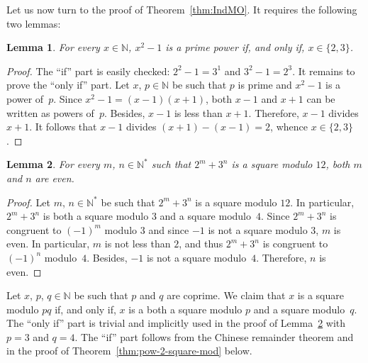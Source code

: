 \documentclass[12pt]{article}
\newcommand{\bN}{\mathbb{N}} %
\newcommand{\bNast}{\bN^*}
\newtheorem{lemma}{Lemma}
\newtheorem{proposition}{Proposition}
\theoremstyle{definition}
\begin{document}
   
   Let us now turn to the proof of Theorem~\ref{thm:IndMO}.
   It requires the following two lemmas:

     \begin{lemma} \label{lem:x2=q+1}
       For every $x \in \bN$, $x^2 - 1$ is a prime power if, and only if, $x \in \{ 2, 3 \}$. 
     \end{lemma}

     \begin{proof}
       The ``if'' part is easily checked: $2^2 - 1 = 3^1$ and $3^2 - 1 = 2^3$. 
       It remains to prove the ``only if'' part.
       Let $x$, $p \in \bN$ be such that $p$ is prime and $x^2 - 1$ is a power of~$p$.
       Since  $x^2 - 1 = (x - 1)(x + 1)$, 
       both $x - 1$ and $x + 1$ can be written as powers of~$p$.
       Besides, $x - 1$ is less than $x + 1$.
       Therefore, $x - 1$ divides $x + 1$.
       It follows that $x - 1$ divides $(x + 1) - (x - 1) = 2$,
       whence $x \in \{ 2, 3 \}$.
    \end{proof} 
    

   
   \begin{lemma} \label{lem:2m+3n-square-mod-12}
     For every $m$, $n \in \bNast$ such that $2^m + 3^n$ is a square modulo $12$,
     both $m$ and $n$ are even.
   \end{lemma}

   \begin{proof}
     Let $m$, $n \in \bNast$ be such that $2^m + 3^n$ is a square modulo $12$.
     In particular, $2^m + 3^n$ is both a square modulo $3$ and a square modulo~$4$.
     Since $2^m + 3^n$ is congruent to ${(- 1)}^m$ modulo $3$ and since $- 1$ is not a square modulo $3$,
     $m$ is even.
     In particular, $m$ is not less than $2$, and thus $2^m + 3^n$ is congruent to ${(- 1)}^n$ modulo~$4$.
     Besides, $- 1$ is not a square modulo~$4$.
     Therefore, $n$ is even.
   \end{proof}

   Let $x$, $p$, $q \in \bN$ be such that $p$ and $q$ are coprime.
   We claim that 
   $x$ is a square modulo $p q$
   if, and only if, $x$ is a both a square modulo $p$ and a square modulo~$q$.
   The ``only if'' part is trivial and
   implicitly used in the proof of Lemma~\ref{lem:2m+3n-square-mod-12} with $p = 3$ and $q = 4$.
   The ``if'' part follows from the Chinese remainder theorem and
 in the proof of Theorem~\ref{thm:pow-2-square-mod} below.
\end{document}
